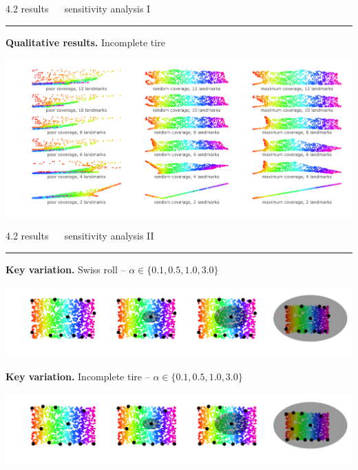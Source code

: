 \documentclass[11pt, compress, t, notes = noshow, xcolor = table, 
aspectratio = 1610]{beamer}
\begin{document}

\LARGE
\begin{frame}{\textcolor{gray!90}{4.2 results} ~~ sensitivity analysis I}
\normalsize
\vspace{-0.5cm}
\noindent \textcolor{gray!90}{\rule{\textwidth}{1pt}}
\smallskip

\textbf{Qualitative results.} Incomplete tire

\vspace{0.3cm}

\includegraphics[trim = 40 10 0 0, clip, %
    width = \textwidth]{figures/sensitivity_landmarks_qual_tire}

\end{frame}


\LARGE
\begin{frame}{\textcolor{gray!90}{4.2 results} ~~ sensitivity analysis II}
\normalsize
\vspace{-0.5cm}
\noindent \textcolor{gray!90}{\rule{\textwidth}{1pt}}
\smallskip

\textbf{Key variation.} Swiss roll -- $\alpha \in \{0.1, 0.5, 1.0, 3.0\}$ 

\includegraphics[trim = 40 30 0 0, clip, %
    width = \textwidth]{figures/sensitivity_noise_key_swiss}
    
    
\textbf{Key variation.} Incomplete tire -- $\alpha \in \{0.1, 0.5, 1.0, 3.0\}$ 

\includegraphics[trim = 40 30 0 0, clip, %
    width = \textwidth]{figures/sensitivity_noise_key_tire}    
    
\end{frame}
\end{document}
